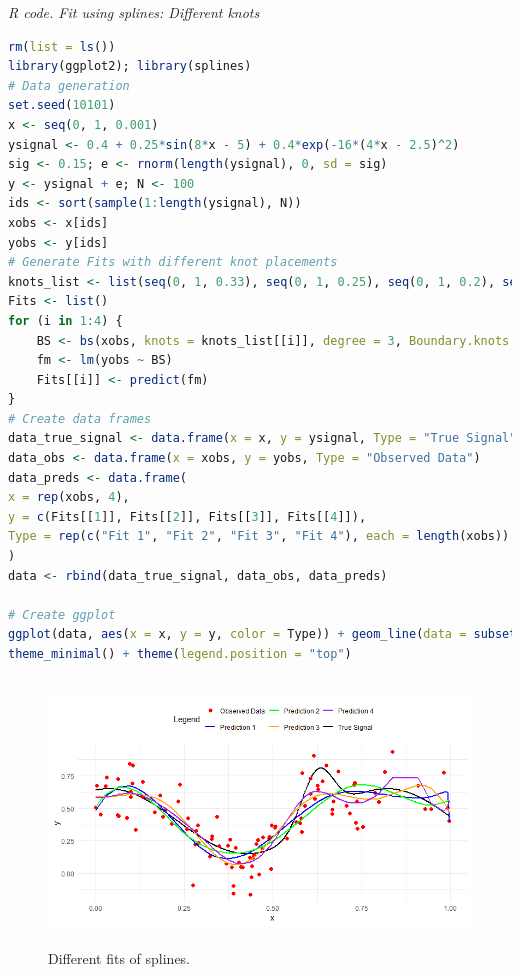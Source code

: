 \begin{tcolorbox}[enhanced,width=4.67in,center upper,
	fontupper=\large\bfseries,drop shadow southwest,sharp corners]
	\textit{R code. Fit using splines: Different knots}
	\begin{VF}
		\begin{lstlisting}[language=R]
rm(list = ls())
library(ggplot2); library(splines)
# Data generation
set.seed(10101)
x <- seq(0, 1, 0.001)
ysignal <- 0.4 + 0.25*sin(8*x - 5) + 0.4*exp(-16*(4*x - 2.5)^2)
sig <- 0.15; e <- rnorm(length(ysignal), 0, sd = sig)
y <- ysignal + e; N <- 100
ids <- sort(sample(1:length(ysignal), N))
xobs <- x[ids]
yobs <- y[ids]
# Generate Fits with different knot placements
knots_list <- list(seq(0, 1, 0.33), seq(0, 1, 0.25), seq(0, 1, 0.2), seq(0, 1, 0.1))
Fits <- list()
for (i in 1:4) {
	BS <- bs(xobs, knots = knots_list[[i]], degree = 3, Boundary.knots = range(x), intercept = FALSE)
	fm <- lm(yobs ~ BS)
	Fits[[i]] <- predict(fm)
}
# Create data frames
data_true_signal <- data.frame(x = x, y = ysignal, Type = "True Signal")
data_obs <- data.frame(x = xobs, y = yobs, Type = "Observed Data")
data_preds <- data.frame(
x = rep(xobs, 4),
y = c(Fits[[1]], Fits[[2]], Fits[[3]], Fits[[4]]),
Type = rep(c("Fit 1", "Fit 2", "Fit 3", "Fit 4"), each = length(xobs))
)
data <- rbind(data_true_signal, data_obs, data_preds)

# Create ggplot
ggplot(data, aes(x = x, y = y, color = Type)) + geom_line(data = subset(data, Type == "True Signal"), linewidth = 1) + geom_point(data = subset(data, Type == "Observed Data"), shape = 16, size = 2) + geom_line(data = subset(data, grepl("Fit", Type)), linewidth = 1, linetype = "solid") + scale_color_manual(values = c("True Signal" = "black", "Observed Data" = "red", "Fit 1" = "blue", "Fit 2" = "green", "Fit 3" = "orange", "Fit 4" = "purple")) + labs(y = "y", color = "Legend") +
theme_minimal() + theme(legend.position = "top")
\end{lstlisting}
	\end{VF}
\end{tcolorbox}

\begin{figure}[!h]
	\includegraphics[width=340pt, height=200pt]{Chapters/chapter11/figures/SplineFit.png}
	\caption[List of figure caption goes here]{Different fits of splines.}\label{figFitBsplines}
\end{figure}

